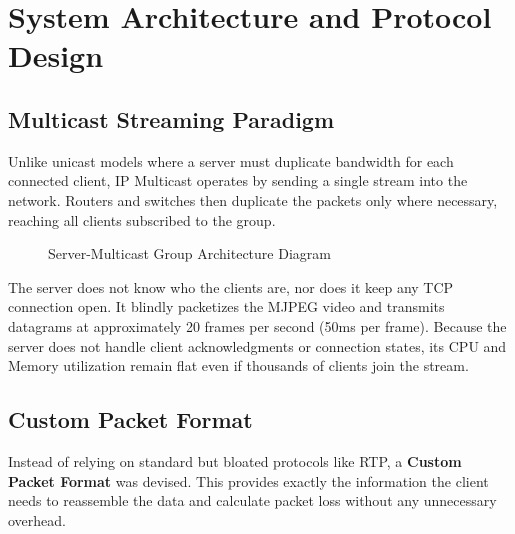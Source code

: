 \documentclass[12pt,a4paper]{report}
\begin{document}
\newpage

\chapter{System Architecture and Protocol Design}

\section{Multicast Streaming Paradigm}
Unlike unicast models where a server must duplicate bandwidth for each connected client, IP Multicast operates by sending a single stream into the network. Routers and switches then duplicate the packets only where necessary, reaching all clients subscribed to the group.

\begin{figure}[H]
    \centering
    \caption{Server-Multicast Group Architecture Diagram}
\end{figure}

The server does not know who the clients are, nor does it keep any TCP connection open. It blindly packetizes the MJPEG video and transmits datagrams at approximately 20 frames per second (50ms per frame). Because the server does not handle client acknowledgments or connection states, its CPU and Memory utilization remain flat even if thousands of clients join the stream.



\section{Custom Packet Format}
Instead of relying on standard but bloated protocols like RTP, a \textbf{Custom Packet Format} was devised. This provides exactly the information the client needs to reassemble the data and calculate packet loss without any unnecessary overhead.
\end{document}
